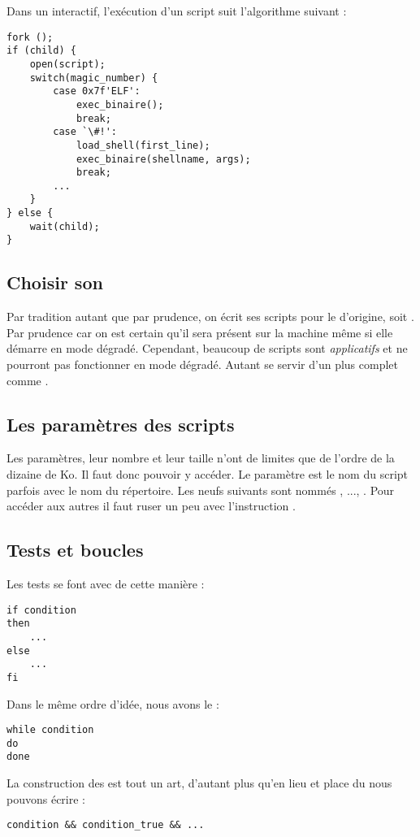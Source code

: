 Dans un \shell interactif, l'exécution d'un script suit l'algorithme suivant :

\begin{lstlisting}
fork ();
if (child) {
	open(script);
	switch(magic_number) {
		case 0x7f'ELF':
			exec_binaire();
			break;
		case `\#!':
			load_shell(first_line);
			exec_binaire(shellname, args);
			break;
		...
	}
} else {
	wait(child);
}
\end{lstlisting}

\subsection{Choisir son \shell}
Par tradition autant que par prudence, on écrit ses scripts \shell pour le \shell d'origine, soit \sh. Par prudence car on est certain qu'il sera présent sur la machine même si elle démarre en mode dégradé. Cependant, beaucoup de scripts sont \emph{applicatifs} et ne pourront pas fonctionner en mode dégradé. Autant se servir d'un \shell plus complet comme \bash.

\subsection{Les paramètres des scripts}

Les paramètres, leur nombre et leur taille n'ont de limites que de l'ordre de la dizaine de Ko. Il faut donc pouvoir y accéder. Le paramètre  est le nom du script parfois avec le nom du répertoire. Les neufs suivants sont nommés , ..., . Pour accéder aux autres il faut ruser un peu avec l'instruction .

\subsection{Tests et boucles}
Les tests se font avec  de cette manière :
\begin{lstlisting}
if condition
then
	...
else
	...
fi
\end{lstlisting}

Dans le même ordre d'idée, nous avons le  :
\begin{lstlisting}
while condition
do
done
\end{lstlisting}

La construction des  est tout un art, d'autant plus qu'en lieu et place du  nous pouvons écrire :
\begin{lstlisting}
condition && condition_true && ...
\end{lstlisting}

